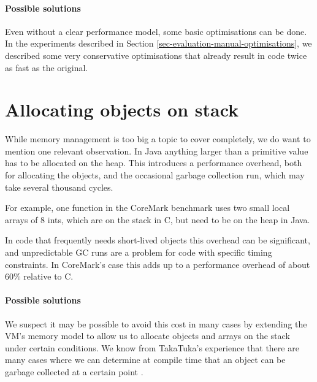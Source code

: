 \paragraph{Possible solutions}
Even without a clear performance model, some basic optimisations can be done. In the experiments described in Section \ref{sec-evaluation-manual-optimisations}, we described some very conservative optimisations that already result in code twice as fast as the original.




\section{Allocating objects on stack}
\label{sec-no-gc}
While memory management is too big a topic to cover completely, we do want to mention one relevant observation. In Java anything larger than a primitive value has to be allocated on the heap. This introduces a performance overhead, both for allocating the objects, and the occasional garbage collection run, which may take several thousand cycles.

For example, one function in the CoreMark benchmark uses two small local arrays of 8 ints, which are on the stack in C, but need to be on the heap in Java.

In code that frequently needs short-lived objects this overhead can be significant, and unpredictable GC runs are a problem for code with specific timing constraints. In CoreMark's case this adds up to a performance overhead of about 60\% relative to C.



\paragraph{Possible solutions}
We suspect it may be possible to avoid this cost in many cases by extending the VM's memory model to allow us to allocate objects and arrays on the stack under certain conditions. We know from TakaTuka's experience that there are many cases where we can determine at compile time that an object can be garbage collected at a certain point \cite{aslam2010optimized}.


